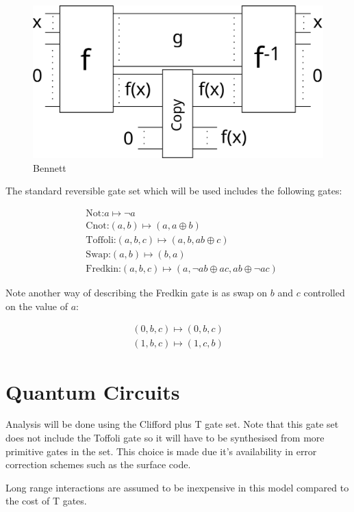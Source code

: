 \begin{figure}
      \capstart
      \centering
      \includegraphics[width=0.8\hsize]{images/bennett}

      \caption{Bennett}

      \label{fig:bennett}
\end{figure}

The standard reversible gate set which will be used includes the following gates:

\begin{align*}
	&\text{Not:} a \mapsto \neg a \\
	&\text{Cnot:} (a,b) \mapsto (a,a\oplus b) \\
    &\text{Toffoli:} (a,b,c) \mapsto (a,b,ab\oplus c) \\
	&\text{Swap:} (a,b) \mapsto (b,a) \\
	&\text{Fredkin:} (a,b,c) \mapsto (a,\neg a b \oplus ac, ab\oplus \neg a c)
\end{align*}

Note another way of describing the Fredkin gate is as swap on $b$ and $c$
controlled on the value of $a$:

\begin{align*}
    (0,b,c) \mapsto (0,b,c)\\
    (1,b,c) \mapsto (1,c,b)
\end{align*}


\section{Quantum Circuits}

Analysis will be done using the Clifford plus T gate set.  Note that this gate
set does not include the Toffoli gate so it will have to be synthesised from
more primitive gates in the set.  This choice is made due it's availability in
error correction schemes such as the surface code\cites{}.

Long range interactions are assumed to be inexpensive in this model compared to
the cost of T gates.


